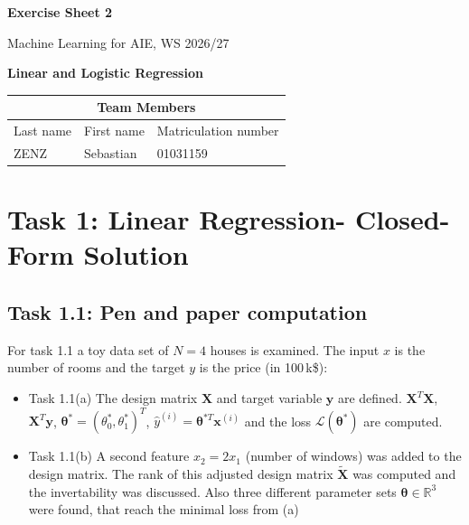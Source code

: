 \documentclass[11pt,a4paper]{article}
\newcommand{\sheetnumber}{2}
\providecommand{\xx}{\mathbf{x}}
\providecommand{\yy}{\mathbf{y}}
\providecommand{\XX}{\mathbf{X}}
\providecommand{\tth}{\boldsymbol{\theta}}
\begin{document}
\begin{titlepage}
  \begin{center}
    {\Large \textbf{Exercise Sheet \sheetnumber}}

    \vspace{0.5em}
    Machine Learning for AIE, WS 2026/27

    \vspace{2em}
    {\LARGE \textbf{Linear and Logistic Regression}}
  \end{center}

  \vspace{2em}
  \begin{center}
    \begin{tabular}{|l|l|l|}\hline
      \multicolumn{3}{|c|}{\textbf{Team Members}} \\\hline
      Last name & First name & Matriculation number \\\hline
      ZENZ & Sebastian & 01031159 \\\hline
    \end{tabular}
  \end{center}
\end{titlepage}

\tableofcontents
\clearpage

\section{Task 1: Linear Regression- Closed-Form Solution}
\label{sec:closedform}

\subsection{Task 1.1: Pen and paper computation}
\label{subsec:closedform1}
For task 1.1 a toy data set of $N = 4$ houses is examined. The input $x$ is the number of rooms and the target $y$ is the price (in 100\,k\$):
\begin{itemize}[itemsep=0.1em]
  \item Task 1.1(a) The design matrix $\XX$ and target variable $\yy$ are defined. $\XX^T\XX$, $\XX^T\yy$, $\tth^* = (\theta_0^*, \theta_1^*)^T$, $\hat{y}^{(i)} = \tth^{*T}\xx^{(i)}$ and the loss $\mathcal{L}(\tth^*)$ are computed. 
  \item Task 1.1(b) A second feature $x_2 = 2x_1$ (number of windows) was added to the design matrix. 
      The rank of this adjusted design matrix $\widetilde{\mathbf{X}}$ was computed and the invertability was discussed. 
      Also three different parameter sets $\tth \in \mathbb{R}^3$ were found, that reach the minimal loss from (a)
\end{itemize}
\end{document}
